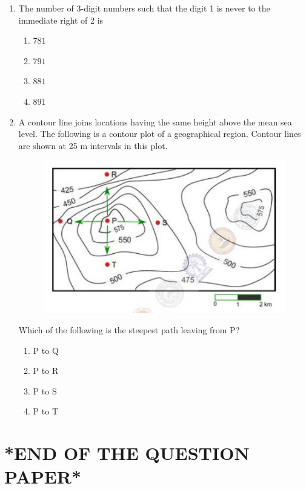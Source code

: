 \documentclass[journal]{IEEEtran}
\theoremstyle{remark}
\begin{document}
\begin{enumerate}
\item The number of 3-digit numbers such that the digit 1 is never to the immediate right of 2 is \hfill{}
\begin{multicols}{4}
\begin{enumerate}
    \item $781$
    \item $791$
    \item $881$
    \item $891$
\end{enumerate}
\end{multicols}

\item A contour line joins locations having the same height above the mean sea level. The following is a contour plot of a geographical region. Contour lines are shown at 25 m intervals in this plot.
\begin{figure}[H]
    \centering
    \includegraphics[width=0.6\columnwidth]{figs/Q.65.png}
    \caption{}
    \label{fig:placeholder}
\end{figure}
Which of the following is the steepest path leaving from P? \hfill{}
\begin{multicols}{4}
\begin{enumerate}
    \item P to Q
    \item P to R
    \item P to S
    \item P to T
\end{enumerate}
\end{multicols}

\end{enumerate}
\section*{*END OF THE QUESTION PAPER*}
 
\end{document}
